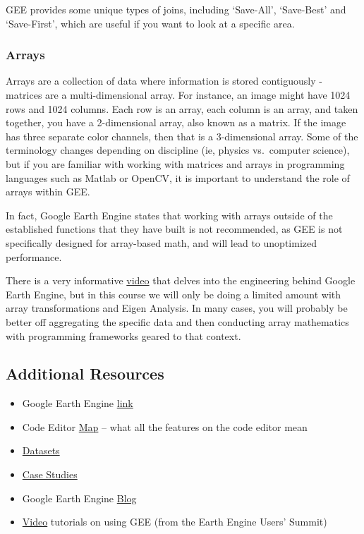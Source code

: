 \documentclass[
]{article}
\providecommand{\tightlist}{%
  \setlength{\itemsep}{0pt}\setlength{\parskip}{0pt}}
\begin{document}
GEE provides some unique types of joins, including `Save-All', `Save-Best' and `Save-First', which are useful if you want to look at a specific area.

\hypertarget{arrays}{%
\subsubsection{Arrays}\label{arrays}}

Arrays are a collection of data where information is stored contiguously - matrices are a multi-dimensional array. For instance, an image might have 1024 rows and 1024 columns. Each row is an array, each column is an array, and taken together, you have a 2-dimensional array, also known as a matrix. If the image has three separate color channels, then that is a 3-dimensional array. Some of the terminology changes depending on discipline (ie, physics vs.~computer science), but if you are familiar with working with matrices and arrays in programming languages such as Matlab or OpenCV, it is important to understand the role of arrays within GEE.

In fact, Google Earth Engine states that working with arrays outside of the established functions that they have built is not recommended, as GEE is not specifically designed for array-based math, and will lead to unoptimized performance.

There is a very informative \href{https://developers.google.com/earth-engine/guides/arrays_intro}{video} that delves into the engineering behind Google Earth Engine, but in this course we will only be doing a limited amount with array transformations and Eigen Analysis. In many cases, you will probably be better off aggregating the specific data and then conducting array mathematics with programming frameworks geared to that context.

\hypertarget{additional-resources}{%
\subsection{Additional Resources}\label{additional-resources}}

\begin{itemize}
\tightlist
\item
  Google Earth Engine \href{https://earthengine.google.com}{link}
\item
  Code Editor \href{https://developers.google.com/earth-engine/guides/playground?hl=en}{Map} -- what all the features on the code editor mean
\item
  \href{https://developers.google.com/earth-engine/datasets/}{Datasets}
\item
  \href{https://earthengine.google.com/case_studies/}{Case Studies}
\item
  Google Earth Engine \href{https://medium.com/google-earth}{Blog}
\item
  \href{https://developers.google.com/earth-engine/tutorials/tutorials}{Video} tutorials on using GEE (from the Earth Engine Users' Summit)
\end{itemize}
\end{document}
